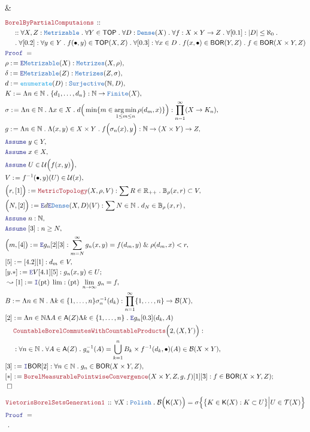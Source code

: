 \documentclass[12pt]{scrartcl}
\newcommand{\TYPE}[1]{\textcolor{NavyBlue}{\mathtt{#1}}}
\newcommand{\FUNC}[1]{\textcolor{Cerulean}{\mathtt{#1}}}
\newcommand{\LOGIC}[1]{\textcolor{Blue}{\mathtt{#1}}}
\newcommand{\THM}[1]{\textcolor{Maroon}{\mathtt{#1}}}
\renewcommand{\.}{\; . \;}
\newcommand{\de}{: \kern 0.1pc =}
\newcommand{\Theorem}[2]{& \THM{#1} \, :: \, #2 \\ & \Proof = \\ }
\newcommand{\NewLine}{\\ & \kern 1pc}
\newcommand{\Page}[1]{ \begin{align*} #1 \end{align*}   }
\renewcommand{\And}{\; \& \;}
\newcommand{\Intro}{\LOGIC{I}}
\newcommand{\Elim}{\LOGIC{E}}
\newcommand{\Reals}{\mathbb{R} }
\newcommand{\Nat}{\mathbb{N} }
\DeclareMathOperator*{\argmin}{arg\,min}
\newcommand{\Say}[3]{& #1 \de #2 : #3, \\}
\newcommand{\SayIn}[3]{& #1 \de #2 \in #3, \\}
\newcommand{\Conclude}[3]{& #1 \de #2 : #3; \\}
\newcommand{\Derive}[3]{& \leadsto #1 \de #2 : #3, \\}
\newcommand{\Assume}[2]{& \LOGIC{Assume} \; #1 : #2, \\}
\newcommand{\AssumeIn}[2]{& \LOGIC{Assume} \; #1 \in #2, \\}
\newcommand{\QED}{\; \square}
\newcommand{\EndProof}{& \QED \\}
\newcommand{\Proof}{\LOGIC{Proof} \; }
\newcommand{\Explain}[1]{& \text{#1.} \\}
\newcommand{\Finite}{\TYPE{Finite}}
\newcommand{\B}{\mathcal{B}}
\newcommand{\Dense}{\TYPE{Dense}}
\newcommand{\TOP}{\mathsf{TOP}}
\newcommand{\T}{\mathcal{T}}
\newcommand{\U}{\mathcal{U}}
\newcommand{\Cell}{\mathbb{B}}
\newcommand{\Polish}{\TYPE{Polish}}
\newcommand{\alg}{\mathsf{A}}
\newcommand{\BOR}{\mathsf{BOR}}
\newcommand{\K}{\mathsf{K}}
\begin{document}
{	\EndProof
}\Page{
	\Theorem{BorelByPartialComputaions}
	{
		\NewLine ::		
		\forall X,Z : \TYPE{Metrizable} \.
		\forall Y \in \TOP \.
		\forall D : \Dense(X) \.
		\forall f : X \times Y \to Z \. 
		\forall [0.1] : |D| \le \aleph_0 \. \NewLine \.
		\forall [0.2] : \forall y \in Y \. f(\bullet,y) \in \TOP(X,Z) \.
		\forall [0.3] : \forall x \in D \.  f(x,\bullet) \in \BOR(Y,Z) \.
		f \in \BOR(X\times Y, Z)
	}
	\Say{\rho}{\Elim \TYPE{Metrizable}(X)}
	{
		\TYPE{Metrizes}(X,\rho)
	}
	\Say{\delta}{\Elim \TYPE{Metrizable}(Z)}
	{
		\TYPE{Metrizes}(Z,\sigma)
	}
	\Say{d}{\FUNC{enumerate}(D)}{\TYPE{Surjective}(\Nat,D)}
	\Say{K}{\Lambda n \in \Nat \.  \{d_1,\ldots,d_n\}}{\Nat \to \Finite(X)}
	\Say{\sigma}{ 
		\Lambda n \in \Nat \. \Lambda x \in X \. 
		d\Big( \min \{  m \in \argmin_{1 \le m \le n} \rho(d_m,x)\} \Big)    
	}
	{
		\prod_{n=1}^\infty  (X \to K_n)
	}
	\Say{g}{\Lambda n \in \Nat \. \Lambda (x,y) \in X\times Y \. f\Big( \sigma_n(x), y\Big)}
	{
		\Nat \to (X \times Y) \to Z
	}
	\AssumeIn{y}{Y}
	\AssumeIn{x}{X}
	\AssumeIn{U}{ \U\Big( f(x,y) \Big) }
	\SayIn{V}{f^{-1}(\bullet ,y)(U)}{\U(x)}
	\Say{\Big(r, [1] \Big)}{\THM{MetricTopology}(X,\rho,V)}
	{
		\sum R \in \Reals_{++} \. \Cell_\rho(x,r) \subset V
	}
	\Say{\Big(N,[2] \Big)}{\Elim d \Elim \Dense(X,D)(V)}
	{
		\sum N \in \Nat \. d_N \in \Cell_\rho\left(x, r\right)
	}
	\Assume{n}{\Nat}
	\Assume{[3]}{n \ge N}
	\Say{\Big(m,[4]\big)}{\Elim g_n [2][3]}
	{\sum^\infty_{m=N} g_n(x,y) = f(d_m,y) \And \rho(d_m,x) < r}
	\Say{[5]}{[4.2][1]}{ d_m \in V}
	\Conclude{[y.*]}{\Elim V [4.1][5]}{g_n(x,y) \in U}
	\Derive{[1]}{\Intro (\mathrm{pt})\;\lim}
	{
		(\mathrm{pt})\;\lim_{n \to \infty} g_n = f
	}
	\Say{B}{\Lambda n \in \Nat \. \Lambda k \in \{1,\ldots,n\} \sigma_n^{-1}(d_k)}
	{
		\prod^\infty_{n=1} \{1,\ldots,n\}  \to \B(X)
	}
	\Say{[2]}{
		\Lambda n \in \Nat
		\Lambda A \in \alg(Z)
		\Lambda k \in \{1,\ldots,n\} \.
		\Elim g_n
		[0.3](d_k,A)
		\NewLine
		\THM{CountableBorelCommutesWithCountableProducts}\Big(2,(X,Y)\Big)	
	}
	{
		\NewLine :		
		\forall n \in \Nat \.		
		\forall A \in \alg(Z) \.
		g_n^{-1}(A) =    \bigcup^n_{k=1} B_k \times f^{-1}(d_k,\bullet)(A) \in \B(X\times Y)
	}
	\Say{[3]}{\Intro \BOR [2]}{\forall n \in \Nat \. g_n \in \BOR(X\times Y, Z)}
	\Conclude{[*]}{
		\THM{BorelMeasurablePointwiseConvergence}(X\times Y, Z,g, f)[1][3]	
	}
	{
		f \in \BOR(X\times Y, Z)
	}
	\EndProof
}\Page{
	\Theorem{VietorisBorelSetsGeneration1}
	{
		\forall X : \Polish \.
		\B\Big( \K(X) \Big)  = \sigma\Big\{                     
			\big\{
				K \in \K(X)  : K \subset U   
			\big\}	
			\Big|   U \in \T(X)	
		\Big\}
	}
	\Explain{ 
}}
\end{document}

